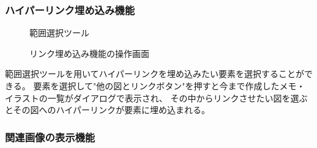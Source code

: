 \subsubsection{ハイパーリンク埋め込み機能}

\begin{figure}[H] \begin{minipage}{0.5\hsize}
                         \begin{center} 
                         \end{center} \caption{範囲選択ツール} \label{fig:addLink1}
\end{minipage} \begin{minipage}{0.5\hsize}
                   \begin{center} 
                   \end{center} \caption{リンク埋め込み機能の操作画面} \label{fig:addLink2}
\end{minipage}
\end{figure}

範囲選択ツールを用いてハイパーリンクを埋め込みたい要素を選択することができる。
要素を選択して"他の図とリンクボタン"を押すと今まで作成したメモ・イラストの一覧がダイアログで表示され、
その中からリンクさせたい図を選ぶとその図へのハイパーリンクが要素に埋め込まれる。

\subsubsection{関連画像の表示機能}

